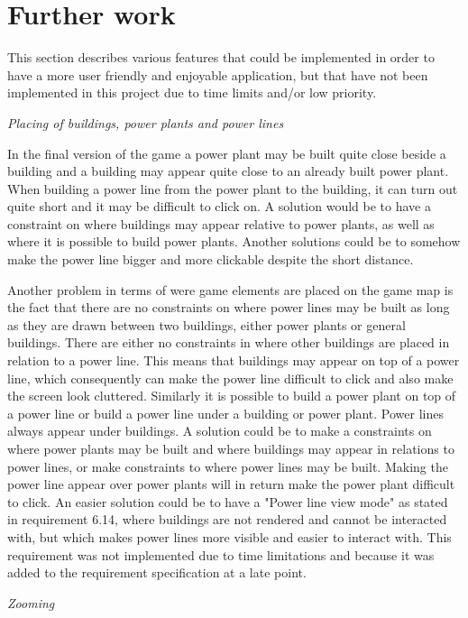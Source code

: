 \section{Further work}

This section describes various features that could be implemented in order to have a 
more user friendly and enjoyable application, but that have not been implemented in 
this project due to time limits and/or low priority.

\textit{Placing of buildings, power plants and power lines}

In the final version of the game a power plant may be built quite close beside a building 
and a building may appear quite close to an already built power plant. When building a power 
line from the power plant to the building, it can turn out quite short and it may be difficult 
to click on. A solution would be to have a constraint on where buildings may appear relative 
to power plants, as well as where it is possible to build power plants. Another solutions 
could be to somehow make the power line bigger and more clickable despite the short distance. 

Another problem in terms of were game elements are placed on the game map is the fact that 
there are no constraints on where power lines may be built as long as they are drawn between 
two buildings, either power plants or general buildings. There are either no constraints in 
where other buildings are placed in relation to a power line. This means that buildings may 
appear on top of a power line, which consequently can make the power line difficult to click 
and also make the screen look cluttered. Similarly it is possible to build a power plant on 
top of a power line or build a power line under a building or power plant. Power lines always 
appear under buildings. A solution could be to make a constraints on where power plants 
may be built and where buildings may appear in relations to power lines, or make constraints 
to where power lines may be built. Making the power line appear over power plants will in return 
make the power plant difficult to click. An easier solution could be to have a 
"Power line view mode" as stated in requirement 6.14, where buildings are not rendered and 
cannot be interacted with, but which makes power lines more visible and easier to interact with.
This requirement was not implemented due to time limitations and because it was added to the 
requirement specification at a late point.

\textit{Zooming}

